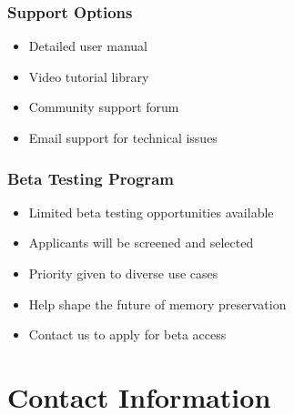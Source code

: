 \documentclass[11pt,letterpaper]{article}
\begin{document}
\subsubsection{Support Options}
\begin{itemize}[leftmargin=*]
    \item Detailed user manual
    \item Video tutorial library
    \item Community support forum
    \item Email support for technical issues
\end{itemize}

\subsubsection{Beta Testing Program}
\begin{itemize}[leftmargin=*]
    \item Limited beta testing opportunities available
    \item Applicants will be screened and selected
    \item Priority given to diverse use cases
    \item Help shape the future of memory preservation
    \item Contact us to apply for beta access
\end{itemize}

\newpage
\section*{Contact Information}
\end{document}
